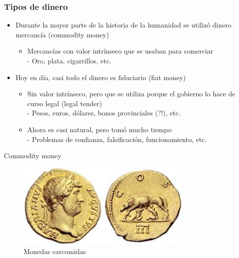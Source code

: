 \documentclass{beamer}
\begin{document}
\begin{frame}
\frametitle{Tipos de dinero}
\begin{itemize}
    \item Durante la mayor parte de la historia de la humanidad se utilizó dinero mercancía (commodity money)
        \begin{itemize}
        \item Mercancías con valor intrínseco que se usaban para comerciar \\
        - Oro, plata, cigarrillos, etc.
        \end{itemize} \vspace{1mm}
    \item Hoy en día, casi todo el dinero es fiduciario (fiat money)               \begin{itemize}
        \item Sin valor intrínseco, pero que se utiliza porque el gobierno lo hace de curso legal (legal tender) \\
        - Pesos, euros, dólares, bonos provinciales (?!), etc.
        \item Ahora es casi natural, pero tomó mucho tiempo \\
        - Problemas de confianza, falsificación, funcionamiento, etc.
        \end{itemize}
\end{itemize}
\end{frame}

\begin{frame}{Commodity money }
            \begin{figure} [H]   
  \centering
  \includegraphics[width=.8\textwidth]{Slides Principios de Economia/Figures/C32.1.jpg}
      \caption{Monedas carcomidas}
  \label{fig:C32.1}
\end{figure}
\end{frame}
\end{document}
